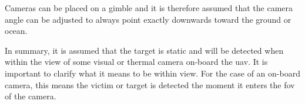 Cameras can be placed on a gimble and it is therefore assumed that the camera angle can be adjusted to always point exactly downwards toward the ground or ocean. 

In summary, it is assumed that the target is static and will be detected when within the view of some visual or thermal camera on-board the \ac{uav}. It is important to clarify what it means to be within view. For the case of an on-board camera, this means the victim or target is detected the moment it enters the \ac{fov} of the camera. 



